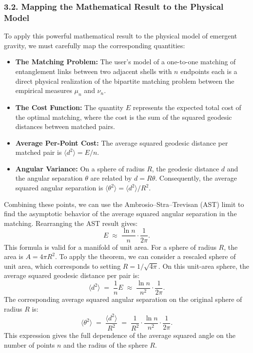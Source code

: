 \documentclass[11pt]{article}
\begin{document}
\subsubsection*{3.2. Mapping the Mathematical Result to the Physical Model}
To apply this powerful mathematical result to the physical model of emergent gravity, we must carefully map the corresponding quantities:

\begin{itemize}
  \item \textbf{The Matching Problem:} The user’s model of a one-to-one matching of entanglement links between two adjacent shells with $n$ endpoints each is a direct physical realization of the bipartite matching problem between the empirical measures $\mu_n$ and $\nu_n$.
  \item \textbf{The Cost Function:} The quantity $E$ represents the expected total cost of the optimal matching, where the cost is the sum of the squared geodesic distances between matched pairs.
  \item \textbf{Average Per-Point Cost:} The average squared geodesic distance per matched pair is $\langle d^2 \rangle = E/n$.
  \item \textbf{Angular Variance:} On a sphere of radius $R$, the geodesic distance $d$ and the angular separation $\theta$ are related by $d = R \theta$. Consequently, the average squared angular separation is $\langle \theta^2 \rangle = \langle d^2 \rangle / R^2$.
\end{itemize}

Combining these points, we can use the Ambrosio–Stra–Trevisan (AST) limit to find the asymptotic behavior of the average squared angular separation in the matching. Rearranging the AST result gives:
\[
E \;\approx\; \frac{\ln n}{n} \cdot \frac{1}{2\pi}.
\]
This formula is valid for a manifold of unit area. For a sphere of radius $R$, the area is $A = 4\pi R^2$. To apply the theorem, we can consider a rescaled sphere of unit area, which corresponds to setting $R = 1/\sqrt{4\pi}$. On this unit-area sphere, the average squared geodesic distance per pair is:
\[
\langle d^2 \rangle \;=\; \frac{1}{n} E \;\approx\; \frac{\ln n}{n^2} \cdot \frac{1}{2\pi}.
\]
The corresponding average squared angular separation on the original sphere of radius $R$ is:
\[
\langle \theta^2 \rangle \;=\; \frac{\langle d^2 \rangle}{R^2} \;=\; \frac{1}{R^2} \cdot \frac{\ln n}{n^2} \cdot \frac{1}{2\pi}.
\]
This expression gives the full dependence of the average squared angle on the number of points $n$ and the radius of the sphere $R$.
\end{document}
